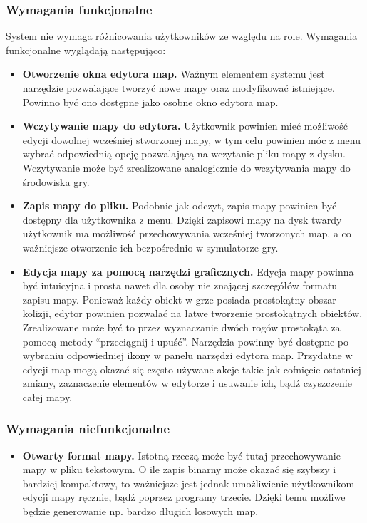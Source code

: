 \subsubsection{Wymagania funkcjonalne}
	System nie wymaga różnicowania użytkowników ze względu na role. Wymagania funkcjonalne wyglądają następująco:
	\begin{itemize}
		
		\item {\bf Otworzenie okna edytora map. }
		\newline
		Ważnym elementem systemu jest narzędzie pozwalające tworzyć nowe mapy oraz modyfikować istniejące.
		Powinno być ono dostępne jako osobne okno edytora map.
		\item {\bf Wczytywanie mapy do edytora. }
		\newline
		Użytkownik powinien mieć możliwość edycji dowolnej wcześniej stworzonej mapy, w tym celu powinien móc z menu wybrać odpowiednią opcję pozwalającą na wczytanie pliku mapy z dysku.
		Wczytywanie może być zrealizowane analogicznie do wczytywania mapy do środowiska gry.
		\item {\bf Zapis mapy do pliku. }
		\newline
		Podobnie jak odczyt, zapis mapy powinien być dostępny dla użytkownika z menu. 
		Dzięki zapisowi mapy na dysk twardy użytkownik ma możliwość przechowywania wcześniej tworzonych map, a co ważniejsze otworzenie ich bezpośrednio w symulatorze gry.
		\item {\bf Edycja mapy za pomocą narzędzi graficznych.}
		\newline
		Edycja mapy powinna być intuicyjna i prosta nawet dla osoby nie znającej szczegółów formatu zapisu mapy. 
		Ponieważ każdy obiekt w grze posiada prostokątny obszar kolizji, edytor powinien pozwalać na łatwe tworzenie prostokątnych obiektów.
		Zrealizowane może być to przez wyznaczanie dwóch rogów prostokąta za pomocą metody ``przeciągnij i upuść''.
		Narzędzia powinny być dostępne po wybraniu odpowiedniej ikony w panelu narzędzi edytora map.
		Przydatne w edycji map mogą okazać się często używane akcje takie jak cofnięcie ostatniej zmiany, zaznaczenie elementów w edytorze i usuwanie ich, bądź czyszczenie całej mapy.
	\end{itemize}
\subsubsection{Wymagania niefunkcjonalne}
	\begin{itemize}
	\item {\bf Otwarty format mapy. }	
	\newline
	Istotną rzeczą może być tutaj przechowywanie mapy w pliku tekstowym. 
	O ile zapis binarny może okazać się szybszy i bardziej kompaktowy, to ważniejsze jest jednak
	umożliwienie użytkownikom edycji mapy ręcznie, bądź poprzez programy trzecie. Dzięki temu możliwe będzie generowanie np. bardzo długich losowych map.
	\end{itemize}


